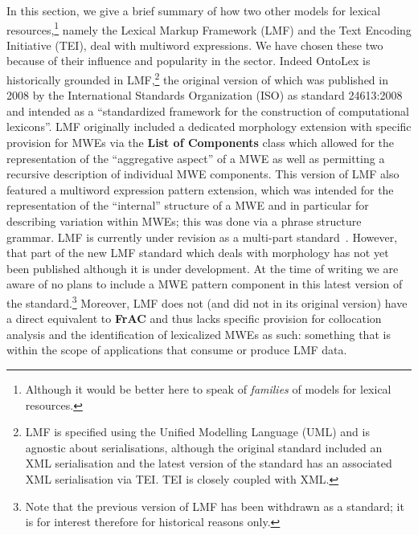 \documentclass[output=paper,colorlinks,citecolor=brown]{langscibook}
\begin{document}
In this section, we give a brief summary of how two other models for lexical resources,\footnote{Although it would be better here to speak of \textit{families} of models for lexical resources.} namely the {Lexical Markup Framework} (LMF) and the {Text Encoding Initiative} (TEI),  deal with multiword expressions. We have chosen these two because of their influence and popularity in the sector. Indeed OntoLex is historically grounded in LMF,\footnote{LMF is specified using the Unified Modelling Language (UML) and is agnostic about serialisations, although the original standard included an XML serialisation and the latest version of the standard has an associated XML serialisation via TEI. TEI is closely coupled with XML.} the original version of which was published in 2008 by the International Standards Organization (ISO) as standard 24613:2008 and intended as a “standardized framework for the construction of computational lexicons”. LMF originally included a dedicated morphology extension with specific provision for MWEs via the \textbf{List of Components} class which allowed for the representation of the “aggregative aspect” of a MWE as well as permitting  a recursive description of individual MWE components. This version of LMF also featured a {multiword expression pattern extension}, which was intended for the representation of the “internal” structure of a MWE and in particular for describing variation within MWEs; this was done via a phrase structure grammar.  LMF is currently under revision as a multi-part standard~\citep{romary2019lmf}. However, that part of the new LMF standard which deals with morphology has not yet been published although it is under development. At the time of writing we are aware of no plans to include a MWE pattern component in this latest version of the standard.\footnote{Note that the previous version of LMF has been withdrawn as a standard; it is for interest therefore for historical reasons only.}
Moreover, LMF does not (and did not in its original version) have a direct equivalent to \textbf{FrAC} and thus lacks specific provision for collocation analysis and the identification of lexicalized MWEs as such: something that is within the scope of applications that consume or produce LMF data.
\end{document}
